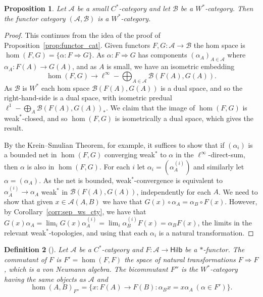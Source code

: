 \documentclass[a4paper,11pt]{article}
\theoremstyle{plain}
\newtheorem{proposition}{Proposition}[section]
\newtheorem{definition}[proposition]{Definition}
\theoremstyle{remark}
\newcommand{\mc}[1]{\mathcal{#1}}
\newcommand{\catHilb}{\textsf{Hilb}}
\begin{document}
\begin{proposition}\label{prop:func_cat_wstar}
Let $\mc A$ be a small $C^*$-category and let $\mc B$ be a $W^*$-category.  Then the functor category $(\mc A,\mc B)$ is a $W^*$-category.
\end{proposition}
\begin{proof}
This continues from the idea of the proof of Proposition~\ref{prop:functor_cat}.  Given functors $F,G\colon\mc A\to\mc B$ the hom space is $\hom(F,G) = \{ \alpha \colon F \Rightarrow G \}$.  As $\alpha \colon F\Rightarrow G$ has components $(\alpha_A)_{A\in\mc A}$ where $\alpha_A \colon F(A) \to G(A)$, and as $A$ is small, we have an isometric embedding
\[ \hom(F,G) \to \ell^\infty - \bigoplus_{A\in\mc A} \mc B(F(A), G(A)). \]
As $\mc B$ is $W^*$ each hom space $\mc B(F(A), G(A))$ is a dual space, and so the right-hand-side is a dual space, with isometric predual $\ell^1-\bigoplus_A \mc B(F(A), G(A))_*$.  We claim that the image of $\hom(F,G)$ is weak$^*$-closed, and so $\hom(F,G)$ is isometrically a dual space, which gives the result.

By the Krein--Smulian Theorem, \cite[Theorem~12.1]{Conway_FunctionalAnalysisBook} for example, it suffices to show that if $(\alpha_i)$ is a bounded net in $\hom(F,G)$ converging weak$^*$ to $\alpha$ in the $\ell^\infty$-direct-sum, then $\alpha$ is also in $\hom(F,G)$.  For each $i$ let $\alpha_i = (\alpha^{(i)}_A)$ and similarly let $\alpha = (\alpha_A)$.  As the net is bounded, weak$^*$-convergence is equivalent to $\alpha^{(i)}_A \to \alpha_A$ weak$^*$ in $\mc B(F(A), G(A))$, independently for each $A$.  We need to show that given $x\in\mc A(A,B)$ we have that $G(x) \circ \alpha_A = \alpha_B \circ F(x)$.  However, by Corollary~\ref{corr:sep_ws_cty}, we have that $G(x) \alpha_A = \lim_i G(x) \alpha^{(i)}_A = \lim_i \alpha^{(i)}_B F(x) = \alpha_B F(x)$, the limits in the relevant weak$^*$-topologies, and using that each $\alpha_i$ is a natural transformation.
\end{proof}

\begin{definition}[{\cite[Definition~4.1]{GLR_Wstar_categories}}]\label{defn:commutant}
Let $\mc A$ be a $C^*$-catgeory and $F\colon\mc A\to\catHilb$ be a $*$-functor.  The \emph{commutant} of $F$ is $F' = \hom(F,F)$ the space of natural transformations $F\Rightarrow F$, which is a von Neumann algebra.  The \emph{bicommutant} $F''$ is the $W^*$-category having the same objects as $\mc A$ and
\[ \hom(A,B)_{F''} = \{ x\colon F(A)\to F(B) : \alpha_B x = x\alpha_A \ (\alpha\in F') \}. \]
\end{definition}
\end{document}
